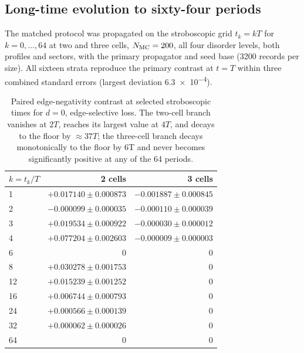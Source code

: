 \documentclass[aps,pra,preprint,superscriptaddress,amsmath,amssymb]{revtex4-2}
\begin{document}
\subsection{Long-time evolution to sixty-four periods}
\label{sec:longtime}

The matched protocol was propagated on the stroboscopic grid $t_k=kT$ for $k=\num{0},\ldots,\num{64}$ at two and three cells, $N_{\rm MC}=\num{200}$, all four disorder levels, both profiles and sectors, with the primary propagator and seed base (\num{3200} records per size). All sixteen strata reproduce the primary contrast at $t=T$ within three combined standard errors (largest deviation \num{6.3e-4}).

\begin{table}[h]
\caption{Paired edge-negativity contrast at selected stroboscopic times for $d=\num{0}$, edge-selective loss. The two-cell branch vanishes at $2T$, reaches its largest value at $4T$, and decays to the floor by ${\approx}\num{37}T$; the three-cell branch decays monotonically to the floor by \num{6}T and never becomes significantly positive at any of the \num{64} periods.}
\label{tab:longtime}
\begin{ruledtabular}
\begin{tabular}{lrr}
$k=t_k/T$ & \num{2} cells & \num{3} cells \\
\hline
\num{1} & $+\num{0.017140}\pm\num{0.000873}$ & $-\num{0.001887}\pm\num{0.000845}$ \\
\num{2} & $-\num{0.000099}\pm\num{0.000035}$ & $-\num{0.000110}\pm\num{0.000039}$ \\
\num{3} & $+\num{0.019534}\pm\num{0.000922}$ & $-\num{0.000030}\pm\num{0.000012}$ \\
\num{4} & $+\num{0.077204}\pm\num{0.002603}$ & $-\num{0.000009}\pm\num{0.000003}$ \\
\num{6} & \num{0} & \num{0} \\
\num{8} & $+\num{0.030278}\pm\num{0.001753}$ & \num{0} \\
\num{12} & $+\num{0.015239}\pm\num{0.001252}$ & \num{0} \\
\num{16} & $+\num{0.006744}\pm\num{0.000793}$ & \num{0} \\
\num{24} & $+\num{0.000566}\pm\num{0.000139}$ & \num{0} \\
\num{32} & $+\num{0.000062}\pm\num{0.000026}$ & \num{0} \\
\num{64} & \num{0} & \num{0} \\
\end{tabular}
\end{ruledtabular}
\end{table}
\end{document}
